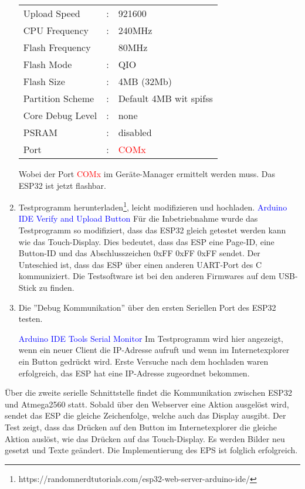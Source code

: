 \begin{enumerate}
\begin{tabular}{lll}
Upload Speed & : & 921600\\
CPU Frequency & : & 240MHz\\
Flash Frequency & & 80MHz\\
Flash Mode & : & QIO\\
Flash Size & : & 4MB (32Mb)\\
Partition Scheme & : & Default 4MB wit spifss\\
Core Debug Level & : & none\\
PSRAM & : & disabled\\
Port & : & \textcolor{red}{COMx}\\
\end{tabular}

Wobei der Port \textcolor{red}{COMx} im Geräte-Manager ermittelt werden muss. Das ESP32 ist jetzt flashbar.\newline

\item Testprogramm herunterladen\footnote{https://randomnerdtutorials.com/esp32-web-server-arduino-ide/}, leicht modifizieren und hochladen.\newline
\textcolor{blue}{Arduino IDE \textrightarrow Verify and Upload Button} \newline
Für die Inbetriebnahme wurde das Testprogramm so modifiziert, dass das ESP32 gleich getestet werden kann wie das Touch-Display. Dies bedeutet, dass das ESP eine Page-ID, eine Button-ID und das Abschlusszeichen 0xFF 0xFF 0xFF sendet. Der Unteschied ist, dass das ESP über einen anderen UART-Port des \textmu C kommuniziert. Die Testsoftware ist bei den anderen Firmwares auf dem USB-Stick zu finden.\newline
\item Die ''Debug Kommunikation'' über den ersten Seriellen Port des ESP32 testen.

\textcolor{blue}{Arduino IDE \textrightarrow Tools \textrightarrow Serial Monitor}\newline
Im Testprogramm wird hier angezeigt, wenn ein neuer Client die IP-Adresse aufruft und wenn im Internetexplorer ein Button gedrückt wird. Erste Versuche nach dem hochladen waren erfolgreich, das ESP hat eine IP-Adresse zugeordnet bekommen.
\end{enumerate}

Über die zweite serielle Schnittstelle findet die Kommunikation zwischen ESP32 und Atmega2560 statt. Sobald über den Webserver eine Aktion ausgelöst wird, sendet das ESP die gleiche Zeichenfolge, welche auch das Display ausgibt. Der Test zeigt, dass das Drücken auf den Button im Internetexplorer die gleiche Aktion auslöst, wie das Drücken auf das Touch-Display. Es werden Bilder neu gesetzt und Texte geändert. Die Implementierung des EPS ist folglich erfolgreich.